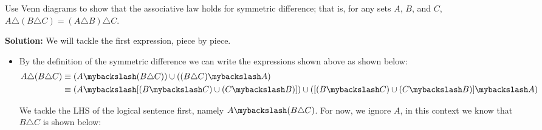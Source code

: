 Use Venn diagrams to show that the associative law holds for symmetric difference; that is, for any sets $A$, $B$, and $C$, $A \triangle (B \triangle C) = (A \triangle B) \triangle C$.

\textbf{Solution:} We will tackle the first expression, piece by piece.
\begin{itemize}
    \item By the definition of the symmetric difference we can write the expressions shown above as shown below:
    \begin{align*}
        A \triangle (B \triangle C) &\equiv (A \mybackslash (B \triangle C)) \cup ((B \triangle C) \mybackslash A) \\
        &\equiv (A \mybackslash [(B \mybackslash C) \cup (C \mybackslash B)]) \cup ([(B \mybackslash C) \cup (C \mybackslash B)] \mybackslash A) \\
    \end{align*}

    We tackle the LHS of the logical sentence first, namely $A \mybackslash (B \triangle C)$. For now, we ignore $A$, in this context we know that  $B \triangle C$ is shown below:



\end{itemize}
